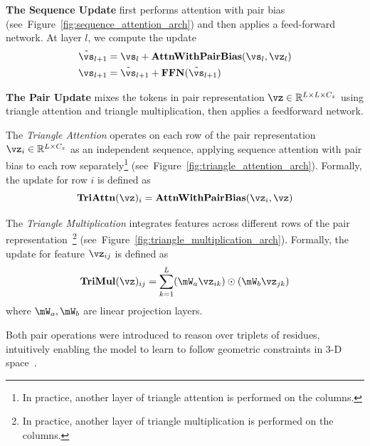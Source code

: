 \documentclass{article} %
\renewcommand{\paragraph}[1]{\vspace{1.25mm}\noindent\textbf{#1}}
\newcommand{\reffig}[1]{Figure~\ref{fig:#1}}
\begin{document}
\paragraph{The Sequence Update} first performs attention with pair bias (see~\reffig{sequence_attention_arch}) and then applies a feed-forward network.
At layer $l$, we compute the update
$$
\begin{aligned}
\tilde{\vs}_{l+1} &= \vs_l + \mathbf{AttnWithPairBias}(\vs_l, \vz_l) \\
\vs_{l+1} &= \tilde{\vs}_{l+1} + \mathbf{FFN}(\tilde{\vs}_{l+1})
\end{aligned}
$$

\paragraph{The Pair Update} mixes the tokens in pair representation $\vz \in \mathbb{R}^{L \times L \times C_z}$ using triangle attention and triangle multiplication, then applies a feedforward network.

The \textit{Triangle Attention} operates on each row of the pair representation $\vz_i \in \mathbb{R}^{L \times C_z}$ as an independent sequence, applying sequence attention with pair bias to each row separately\footnote{In practice, another layer of triangle attention is performed on the columns.} (see~\reffig{triangle_attention_arch}).
Formally, the update for row $i$ is defined as
$$\mathbf{TriAttn}(\vz)_i = \mathbf{AttnWithPairBias}(\vz_i, \vz) $$


The \textit{Triangle Multiplication} integrates features across different rows of the pair representation~\footnote{In practice, another layer of triangle multiplication is performed on the columns.} (see~\reffig{triangle_multiplication_arch}).
Formally, the update for feature $\vz_{ij}$ is defined as 
$$\mathbf{TriMul}(\vz)_{ij} = \sum_{k=1}^L ( \mW_a \vz_{ik}) \odot (\mW_b \vz_{jk})$$
where $\mW_a, \mW_b$ are linear projection layers. 

Both pair operations were introduced to reason over triplets of residues, intuitively enabling the model to learn to follow geometric constraints in 3-D space~\citep{jumper2021alphafold2}.
\end{document}
